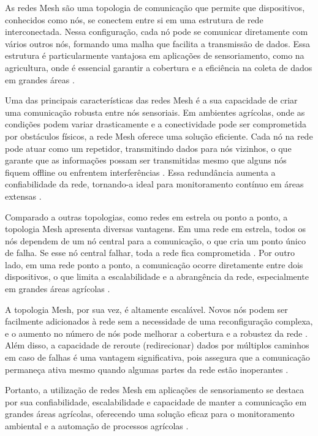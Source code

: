 As redes Mesh são uma topologia de comunicação que permite que dispositivos, conhecidos como nós, se conectem entre si em uma estrutura de rede interconectada. Nessa configuração, cada nó pode se comunicar diretamente com vários outros nós, formando uma malha que facilita a transmissão de dados. Essa estrutura é particularmente vantajosa em aplicações de sensoriamento, como na agricultura, onde é essencial garantir a cobertura e a eficiência na coleta de dados em grandes áreas \cite{lewis2019, zhao2018}.

Uma das principais características das redes Mesh é a sua capacidade de criar uma comunicação robusta entre nós sensoriais. Em ambientes agrícolas, onde as condições podem variar drasticamente e a conectividade pode ser comprometida por obstáculos físicos, a rede Mesh oferece uma solução eficiente. Cada nó na rede pode atuar como um repetidor, transmitindo dados para nós vizinhos, o que garante que as informações possam ser transmitidas mesmo que alguns nós fiquem offline ou enfrentem interferências \cite{chen2021}. Essa redundância aumenta a confiabilidade da rede, tornando-a ideal para monitoramento contínuo em áreas extensas \cite{morris2020}.

Comparado a outras topologias, como redes em estrela ou ponto a ponto, a topologia Mesh apresenta diversas vantagens. Em uma rede em estrela, todos os nós dependem de um nó central para a comunicação, o que cria um ponto único de falha. Se esse nó central falhar, toda a rede fica comprometida \cite{Tanenbaum2011}. Por outro lado, em uma rede ponto a ponto, a comunicação ocorre diretamente entre dois dispositivos, o que limita a escalabilidade e a abrangência da rede, especialmente em grandes áreas agrícolas \cite{morris2020}.

A topologia Mesh, por sua vez, é altamente escalável. Novos nós podem ser facilmente adicionados à rede sem a necessidade de uma reconfiguração complexa, e o aumento no número de nós pode melhorar a cobertura e a robustez da rede \cite{lewis2019, chen2021}. Além disso, a capacidade de reroute (redirecionar) dados por múltiplos caminhos em caso de falhas é uma vantagem significativa, pois assegura que a comunicação permaneça ativa mesmo quando algumas partes da rede estão inoperantes \cite{morris2020}.

Portanto, a utilização de redes Mesh em aplicações de sensoriamento se destaca por sua confiabilidade, escalabilidade e capacidade de manter a comunicação em grandes áreas agrícolas, oferecendo uma solução eficaz para o monitoramento ambiental e a automação de processos agrícolas \cite{chen2021}.

